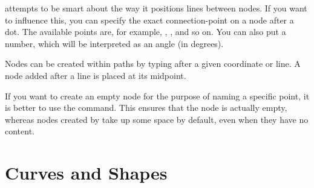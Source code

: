 \begin{example}
\end{example}
\TikZ{} attempts to be smart about the way it positions lines between nodes.
If you want to influence this, you can specify the exact connection-point on a node
after a dot. The available points are, for example, ,
,  and so on. You can also put a number, which
will be interpreted as an angle (in degrees).
\begin{example}
\end{example}

Nodes can be created within paths by typing 
after a given coordinate or line. A node added after a line
is placed at its midpoint. %
\begin{example}
\end{example}

If you want to create an empty node for the purpose of naming a specific point,
it is better to use the  command. This
ensures that the node is actually empty, whereas nodes created by 
take up some space by default, even when they have no content.
\begin{example}
\end{example}

\section{Curves and Shapes}

